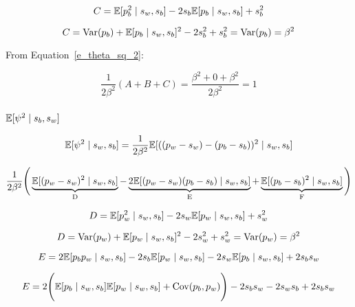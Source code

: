 \documentclass[a4paper,11pt]{article}
\theoremstyle{mytheor}
\newcommand{\E}{\Bbb{E}}
\newcommand{\Var}{\mathrm{Var}}
\newcommand{\Cov}{\mathrm{Cov}}
\begin{document}
\begin{equation}
    \label{e_theta_sq_2_c}
    C=\Bbb{E}[p_b^2\mid s_w,s_b] - 2s_b\Bbb{E}[p_b\mid s_w,s_b] + s_{b}^{2}
\end{equation}

\begin{equation}
    \label{e_theta_sq_2_c_1}
    C=\Var(p_b)+\E[p_b\mid s_w,s_b]^2 - 2s_b^2 + s_{b}^{2} = \Var(p_b) = \beta^2
\end{equation}

From Equation~\ref{e_theta_sq_2}:

\begin{equation}
    \label{e_theta_sq_all_combined}
    \frac{1}{2\beta^2}(A+B+C)=\frac{\beta^2+0+\beta^2}{2\beta^2} = 1
\end{equation}

\subsubsection{$\E[\psi^2 \mid s_b,s_w]$}

\begin{equation}
    \label{e_psi_sq}
    \Bbb{E}[\psi^2\mid s_w,s_b] = \frac{1}{2\beta^2}\Bbb{E}[((p_w-s_w)-(p_b-s_b))^2 \mid s_w,s_b]
\end{equation}

\begin{equation}
    \label{e_psi_sq_2}
    \frac{1}{2\beta^2} \Bigg( \underbrace{\Bbb{E}[(p_w-s_w)^2\mid s_w,s_b]}_\text{D} - \underbrace{2\Bbb{E}[(p_w-s_w)(p_b-s_b)\mid s_w,s_b]}_\text{E} + \underbrace{\Bbb{E}[(p_b-s_b)^2\mid s_w,s_b]}_\text{F} \Bigg)
\end{equation}

\begin{equation}
    \label{e_psi_sq_2_a}
    D=\Bbb{E}[p_w^2\mid s_w,s_b] - 2s_w\Bbb{E}[p_w\mid s_w,s_b] + s_{w}^{2}
\end{equation}

\begin{equation}
    \label{e_psi_sq_2_a_1}
    D=\Var(p_w)+\E[p_w\mid s_w,s_b]^2 - 2s_w^2 + s_{w}^{2} = \Var(p_w) = \beta^2
\end{equation}

\begin{equation}
    \label{e_psi_sq_2_b}
    E=2\E[p_bp_w \mid s_w,s_b] - 2s_b\E[p_w \mid s_w,s_b] - 2s_w\E[p_b \mid s_w,s_b] + 2s_bs_w
\end{equation}

\begin{equation}
    \label{e_psi_sq_2_b_1}
    E=2 \Bigg( \E[p_b \mid s_w,s_b]\E[p_w \mid s_w,s_b] + \Cov(p_b,p_w) \Bigg) - 2s_bs_w - 2s_ws_b + 2s_bs_w
\end{equation}
\end{document}
